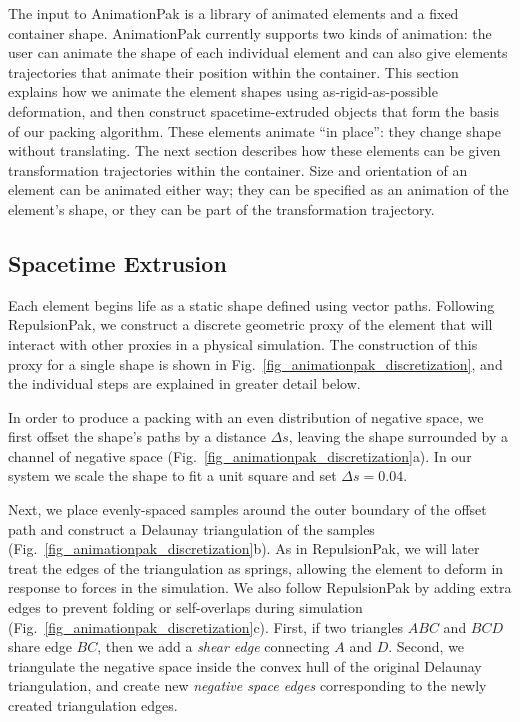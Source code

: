 
The input to AnimationPak is a library of animated elements and a
fixed container shape.  AnimationPak currently supports two kinds
of animation: the user can animate the shape of each individual
element and can also give elements trajectories that animate
their position within the container.  This
section explains how we animate the element shapes using
as-rigid-as-possible deformation, and then construct
spacetime-extruded objects that form the basis of our packing
algorithm.  These elements animate ``in place'': they change
shape without translating. The next section describes how these
elements can be given transformation trajectories within the
container. Size and orientation of an element can be animated
either way; they can be specified as an animation of the element's
shape, or they can be part of the transformation trajectory.



\subsection{Spacetime Extrusion}
\label{animationpak_spacetime_extrusion}

Each element begins life as a static shape defined using
vector paths.  Following RepulsionPak, we construct a discrete
geometric proxy of the element that will interact with other
proxies in a physical simulation.  The construction of this proxy
for a single shape is shown in Fig.~\ref{fig_animationpak_discretization}, and
the individual steps are explained in greater detail below.

In order to produce a packing with an even distribution of negative
space, we first offset the shape's paths by a distance $\Delta s$,
leaving the shape surrounded by a channel of negative space
(Fig.~\ref{fig_animationpak_discretization}a).  In our system
we scale the shape to fit a unit square and set $\Delta s=0.04$.

Next, we place evenly-spaced samples around the outer boundary of 
the offset path and construct a Delaunay triangulation of the samples
(Fig.~\ref{fig_animationpak_discretization}b).  As in RepulsionPak, we will
later treat the edges of the triangulation as springs, allowing the
element to deform in response to forces in the simulation.  
We also follow RepulsionPak by adding extra edges to prevent
folding or self-overlaps during simulation
(Fig.~\ref{fig_animationpak_discretization}c).  First, if two triangles 
$ABC$ and $BCD$ share edge $BC$, then we add a \textit{shear edge}
connecting $A$ and $D$.  Second, we triangulate the negative space
inside the convex hull of the original Delaunay triangulation, and
create new \textit{negative space edges} corresponding to the newly 
created triangulation edges. 

